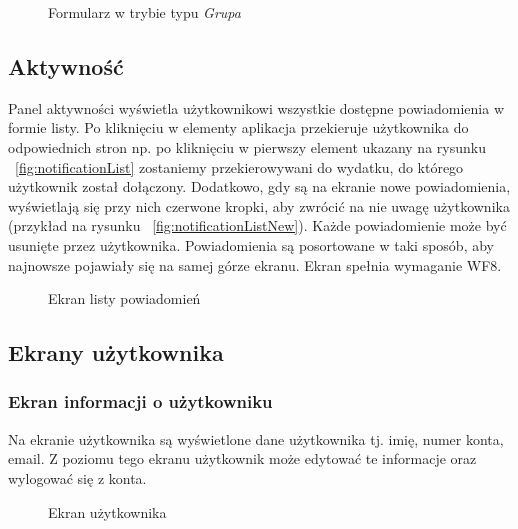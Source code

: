 \begin{figure}[h!]%
    \centering
    \caption{Formularz w trybie typu \emph{Grupa}}
\end{figure}

\clearpage
\subsection{Aktywność}
Panel aktywności wyświetla użytkownikowi wszystkie dostępne powiadomienia w formie listy. Po kliknięciu w elementy aplikacja przekieruje użytkownika do odpowiednich stron np. po kliknięciu w pierwszy element ukazany na rysunku ~\ref{fig:notificationList} zostaniemy przekierowywani do wydatku, do którego użytkownik został dołączony. Dodatkowo, gdy są na ekranie nowe powiadomienia, wyświetlają się przy nich czerwone kropki, aby zwrócić na nie uwagę użytkownika (przykład na rysunku ~\ref{fig:notificationListNew}). Każde powiadomienie może być usunięte przez użytkownika. Powiadomienia są posortowane w taki sposób, aby najnowsze pojawiały się na samej górze ekranu. Ekran spełnia wymaganie WF8.

\begin{figure}[h!]%
    \centering
    \qquad
    \caption{Ekran listy powiadomień}%
\end{figure}

\clearpage
\subsection{Ekrany użytkownika}
\subsubsection{Ekran informacji o użytkowniku}
Na ekranie użytkownika są wyświetlone dane użytkownika tj. imię, numer konta, email. Z poziomu tego ekranu użytkownik może edytować te informacje oraz wylogować się z konta.

\begin{figure}[h!]%
    \centering
    \qquad
    \caption{Ekran użytkownika}%
\end{figure}

